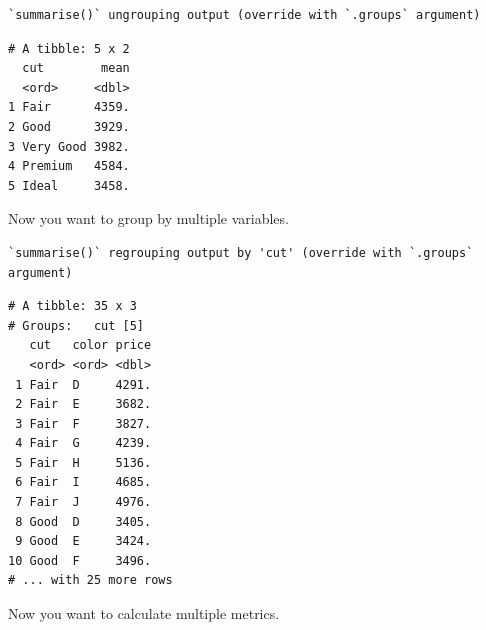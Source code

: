 \documentclass[
]{book}
\newenvironment{Shaded}{\begin{snugshade}}{\end{snugshade}}
\newcommand{\DataTypeTok}[1]{\textcolor[rgb]{0.13,0.29,0.53}{#1}}
\newcommand{\KeywordTok}[1]{\textcolor[rgb]{0.13,0.29,0.53}{\textbf{#1}}}
\newcommand{\NormalTok}[1]{#1}
\newcommand{\OperatorTok}[1]{\textcolor[rgb]{0.81,0.36,0.00}{\textbf{#1}}}
\newcommand{\StringTok}[1]{\textcolor[rgb]{0.31,0.60,0.02}{#1}}
\begin{document}
\begin{Shaded}
\end{Shaded}

\begin{verbatim}
`summarise()` ungrouping output (override with `.groups` argument)
\end{verbatim}

\begin{verbatim}
# A tibble: 5 x 2
  cut        mean
  <ord>     <dbl>
1 Fair      4359.
2 Good      3929.
3 Very Good 3982.
4 Premium   4584.
5 Ideal     3458.
\end{verbatim}

Now you want to group by multiple variables.

\begin{Shaded}
\end{Shaded}

\begin{verbatim}
`summarise()` regrouping output by 'cut' (override with `.groups` argument)
\end{verbatim}

\begin{verbatim}
# A tibble: 35 x 3
# Groups:   cut [5]
   cut   color price
   <ord> <ord> <dbl>
 1 Fair  D     4291.
 2 Fair  E     3682.
 3 Fair  F     3827.
 4 Fair  G     4239.
 5 Fair  H     5136.
 6 Fair  I     4685.
 7 Fair  J     4976.
 8 Good  D     3405.
 9 Good  E     3424.
10 Good  F     3496.
# ... with 25 more rows
\end{verbatim}

Now you want to calculate multiple metrics.

\begin{Shaded}
\end{Shaded}
\end{document}
